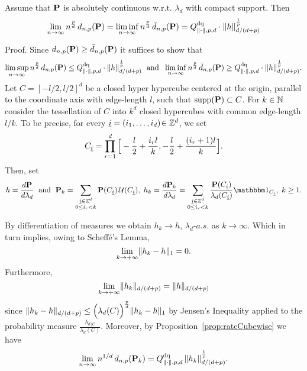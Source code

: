 \begin{prop}\label{prop:rateCompact}
Assume that $\mathbf{P}$
is  absolutely continuous w.r.t. $\lambda_d$ with  compact support. Then
\[
 \lim_{n\to\infty} n^{\frac pd}\,d_{n,p}(\mathbf{P}) = \liminf_{n\to\infty} n^{\frac pd}\, \bar d_{n,p}(\mathbf{P})= Q^{\text{dq}}_{\lVert\cdot\rVert, p, d}\cdot \lVert h\rVert_{d/(d+p)}^{\frac 1p}
\]
\end{prop}
 {\sc Proof.} Since $d_{n,p}(\mathbf{P})\ge \bar d_{n,p}(\mathbf{P})$ it suffices to show that 
\[ \limsup_{n\to\infty} n^{\frac pd}\,d_{n,p}(\mathbf{P}) \leq Q^{\text{dq}}_{\lVert\cdot\rVert, p, d}\cdot \lVert h\rVert_{d/(d+p)}^{\frac 1p}\; \mbox{ and }\;\displaystyle   \liminf_{n\to\infty} n^{\frac pd}\, \bar d_{n,p}(\mathbf{P}) \geq Q^{\text{dq}}_{\lVert\cdot\rVert, p, d}\cdot \lVert h\rVert_{d/(d+p)} ^{\frac1p}.
\]
 Let $C=[-l/2,l/2]^d$ be a  closed hyper hypercube centered at the origin, parallel to the coordinate axis  with
edge-length $l$, such that $\operatorname{supp}(\mathbf{P}) \subset C$.
For $k\in\mathbb{N}$ consider the tessellation of $C$ into $k^d$ closed hypercubes with
common edge-length $l/k$.
To be precise, for every $\underline i=(i_1,\ldots,i_d)\!\in \mathbb{Z}^d$, we set
\[
C_{\underline i} =\displaystyle\prod_{r=1}^d\Big [-\frac l2+\frac{i_rl}{k},-\frac l2+\frac{(i_r+1)l}{k}\Big ].
\]
Then, set \begin{equation} 
h = \frac{d\Probb}{d\lambda_d}\;\mbox{ and }\; 
  \Probb_k  = \sum_{\substack{\underline i\in \Z^d\\ 0\leq i_r < k}}
  \Probb(C_{\underline i}) \, \U(C_{\underline i}),\;h_k =
  \frac{d\Probb_k}{d\lambda_d} = \sum_{\substack{\underline i\in \Z^d\\ 0\leq i_r < k}}
  \frac{\Probb(C_{\underline i})}{\lambda_d(C_{\underline i})}
  \ind{C_{\underline i}}, \; k\ge 1.
\end{equation}

By differentiation of measures we obtain $h_k \to h$, $\lambda_d$-$a.s.$ as $k\to\infty$.
Which in turn implies, owing to  Scheff\'e's Lemma,
\[
\lim_{k\to + \infty} \lVert h_k-h\rVert_1 = 0.
\]
Furthermore, 
\[
\lim_{k\to +\infty} \lVert h_k\rVert_{d/(d+p)} = \lVert h\rVert_{d/(d+p)}
\] 
since $\lVert h_k - h\rVert_{d/(d+p)} \leq \Bigl( \lambda_d(C) \Bigr)^{\frac pd} \lVert h_k
- h\rVert_1$ by  Jensen's Inequality applied to the probability measure
$\frac{\lambda_{d\,|C}}{\lambda_d(C)}$. Moreover, by
Proposition~\ref{prop:rateCubewise} we have
\begin{equation}\label{eq:limit_hk}
 \limn n^{1/d}\, d_{n,p}(\Probb_k) = \Qpn\, \normdp{h_k}^{\frac1p}.
\end{equation}

